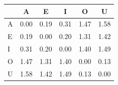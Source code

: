 \begin{tabular}{lccccc}
\toprule
\rowcolor{col01}
 & A & E & I & O & U \\
\midrule
A & 0.00 & 0.19 & 0.31 & 1.47 & 1.58 \\
E & 0.19 & 0.00 & 0.20 & 1.31 & 1.42 \\
I & 0.31 & 0.20 & 0.00 & 1.40 & 1.49 \\
O & 1.47 & 1.31 & 1.40 & 0.00 & 0.13 \\
U & 1.58 & 1.42 & 1.49 & 0.13 & 0.00 \\
\bottomrule
\end{tabular}
